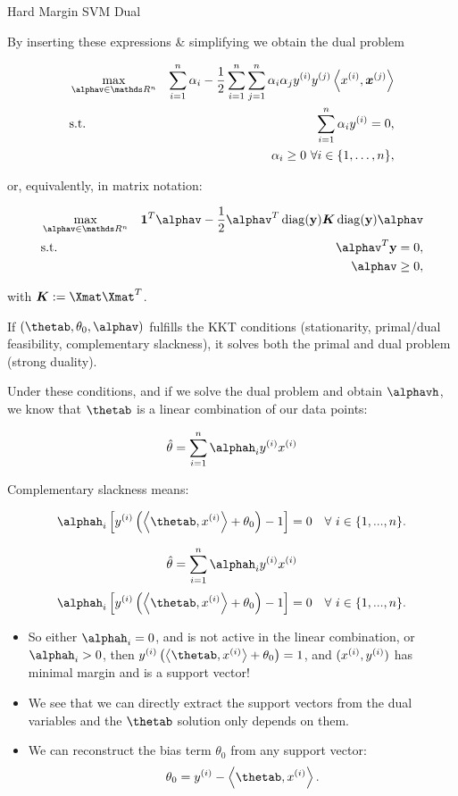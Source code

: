 \begin{vbframe}{Hard Margin SVM Dual}
\framebreak 

By inserting these expressions 
\& simplifying we obtain the dual problem

\vspace*{-0.5cm}
\begin{eqnarray*}
    & \max\limits_{\alphav \in \R^n} & \sum_{i=1}^n \alpha_i - \frac{1}{2}\sum_{i=1}^n\sum_{j=1}^n\alpha_i\alpha_j\yi y^{(j)} \scp{\xi}{\xv^{(j)}} \\
    & \text{s.t.} & \sum_{i=1}^n \alpha_i \yi = 0, \\
    & \quad & \alpha_i \ge 0~\forall i \in \nset,
\end{eqnarray*}

or, equivalently, in matrix notation:

\vspace*{-.5cm}
\begin{eqnarray*}
  & \max\limits_{\alphav \in \R^n} & \one^T \alphav - \frac{1}{2} \alphav^T \diag(\ydat)\bm{K} \diag(\ydat) \alphav \\
  & \text{s.t.} & \alphav^T \ydat = 0, \\
  & \quad & \alphav \geq 0,
\end{eqnarray*}

with $\bm{K}:= \Xmat \Xmat^T$.

\framebreak

If $(\thetab, \theta_0, \alphav)$ fulfills the KKT conditions (stationarity, primal/dual feasibility, complementary slackness), it solves both the primal and dual problem (strong duality). 


Under these conditions, and if we solve the dual problem and obtain $\alphavh$, we know that $\thetab$ is a linear combination of our data points:
  
$$
   \thetah = \sumin \alphah_i \yi \xi 
$$

Complementary slackness means:

$$
\alphah_i \left[\yi  \left( \scp{\thetab}{\xi} + \theta_0 \right) - 1\right] = 0 \quad \forall ~ i \in \{1, ..., n \}.
$$

\framebreak

$$
   \thetah = \sumin \alphah_i \yi \xi 
$$
$$
\alphah_i \left[\yi  \left( \scp{\thetab}{\xi} + \theta_0 \right) - 1\right] = 0 \quad \forall ~ i \in \{1, ..., n \}.
$$

\begin{itemize}
  \item So either $\alphah_i = 0$, and is not active in the linear combination,
    or $\alphah_i > 0$, then $\yi \left( \scp{\thetab}{\xi} + \theta_0 \right) = 1$, and $(x^{(i)}, y^{(i)})$ has minimal margin and is a support vector!
  \item We see that we can directly extract the support vectors from the dual variables and the $\thetab$ solution only depends on them.
  \item We can reconstruct the bias term $\theta_0$ from any support vector:
  $$
  \theta_0 = \yi - \scp{\thetab}{\xi}.
  $$
\end{itemize}


\end{vbframe}
